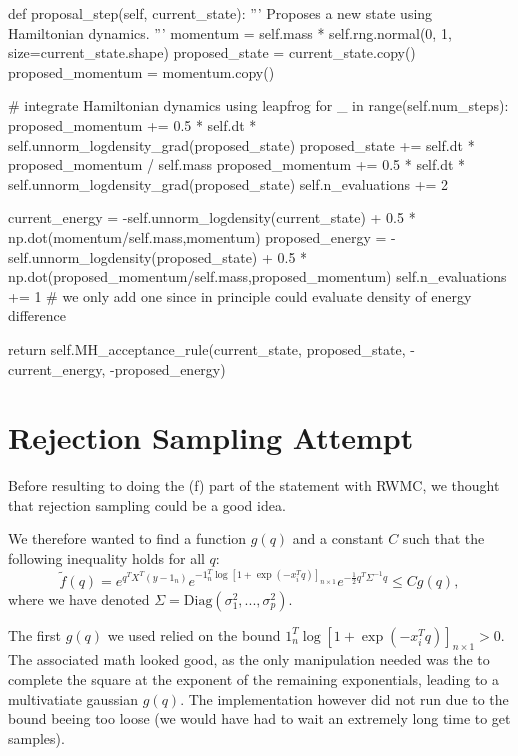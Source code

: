 \documentclass[a4paper, 12pt,oneside]{article}
\begin{document}
\begin{python}
			def proposal_step(self, current_state):
				'''
				Proposes a new state using Hamiltonian dynamics.
				'''
				momentum = self.mass * self.rng.normal(0, 1, size=current_state.shape)
				proposed_state = current_state.copy()
				proposed_momentum = momentum.copy()
				
				# integrate Hamiltonian dynamics using leapfrog
				for _ in range(self.num_steps):
					proposed_momentum += 0.5 * self.dt * self.unnorm_logdensity_grad(proposed_state)
					proposed_state += self.dt * proposed_momentum / self.mass
					proposed_momentum += 0.5 * self.dt * self.unnorm_logdensity_grad(proposed_state)
					self.n_evaluations += 2

				current_energy = -self.unnorm_logdensity(current_state) + 0.5 * np.dot(momentum/self.mass,momentum)
				proposed_energy = -self.unnorm_logdensity(proposed_state) + 0.5 * np.dot(proposed_momentum/self.mass,proposed_momentum)
				self.n_evaluations += 1
				# we only add one since in principle could evaluate density of energy difference
				
				return self.MH_acceptance_rule(current_state, proposed_state, -current_energy, -proposed_energy)
		\end{python}
		\section{Rejection Sampling Attempt}\label{appendix:rejection-sampling-attempt}
		Before resulting to doing the (f) part of the statement with RWMC, we thought that rejection sampling could be a good idea. 
		
		We therefore wanted to find a function $g(q)$ and a constant $C$ such that the following inequality holds for all $q$:
		\begin{equation}
			\tilde{f}(q) = e^{q^TX^T(y-1_{n})}e^{-1_{n}^T \log[1+\exp(-x_i^Tq)]_{n\times 1}}e^{-\frac{1}{2}q^T\Sigma^{-1} q} \leq Cg(q),
		\end{equation}
		where we have denoted $\Sigma=\text{Diag}(\sigma_1^2,...,\sigma_p^2)$.
		
		The first $g(q)$ we used relied on the bound $1_{n}^T \log[1+\exp(-x_i^Tq)]_{n\times 1}>0$. The associated math looked good, as the only manipulation needed was the to complete the square at the exponent of the remaining exponentials, leading to a multivatiate gaussian $g(q)$. The implementation however did not run due to the bound beeing too loose (we would have had to wait an extremely long time to get samples).
\end{document}
